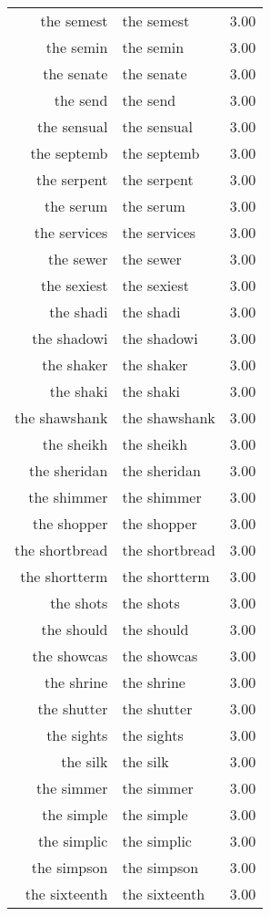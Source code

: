 \begin{table}[ht]
\begin{tabular}{rlr}
  the semest & the semest & 3.00 \\ 
  the semin & the semin & 3.00 \\ 
  the senate & the senate & 3.00 \\ 
  the send & the send & 3.00 \\ 
  the sensual & the sensual & 3.00 \\ 
  the septemb & the septemb & 3.00 \\ 
  the serpent & the serpent & 3.00 \\ 
  the serum & the serum & 3.00 \\ 
  the services & the services & 3.00 \\ 
  the sewer & the sewer & 3.00 \\ 
  the sexiest & the sexiest & 3.00 \\ 
  the shadi & the shadi & 3.00 \\ 
  the shadowi & the shadowi & 3.00 \\ 
  the shaker & the shaker & 3.00 \\ 
  the shaki & the shaki & 3.00 \\ 
  the shawshank & the shawshank & 3.00 \\ 
  the sheikh & the sheikh & 3.00 \\ 
  the sheridan & the sheridan & 3.00 \\ 
  the shimmer & the shimmer & 3.00 \\ 
  the shopper & the shopper & 3.00 \\ 
  the shortbread & the shortbread & 3.00 \\ 
  the shortterm & the shortterm & 3.00 \\ 
  the shots & the shots & 3.00 \\ 
  the should & the should & 3.00 \\ 
  the showcas & the showcas & 3.00 \\ 
  the shrine & the shrine & 3.00 \\ 
  the shutter & the shutter & 3.00 \\ 
  the sights & the sights & 3.00 \\ 
  the silk & the silk & 3.00 \\ 
  the simmer & the simmer & 3.00 \\ 
  the simple & the simple & 3.00 \\ 
  the simplic & the simplic & 3.00 \\ 
  the simpson & the simpson & 3.00 \\ 
  the sixteenth & the sixteenth & 3.00 \\ 

\end{tabular}
\end{table}
